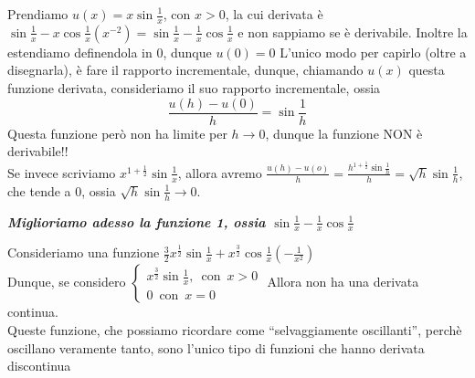 \documentclass{article}
\theoremstyle{definition}
\newcommand{\virgolette}[1]{``#1''}
\begin{document}
Prendiamo $u(x)=x\sin{\frac{1}{x}}$, con $x>0$, la cui derivata è $\sin{\frac{1}{x}}-x\cos{\frac{1}{x}}(x^{-2})=\sin{\frac{1}{x}}-\frac{1}{x}\cos{\frac{1}{x}}$ e non sappiamo se è derivabile. Inoltre la estendiamo definendola in 0, dunque $u(0)=0$ L'unico modo per capirlo (oltre a disegnarla), è fare il rapporto incrementale, dunque, chiamando $u(x)$ questa funzione derivata, consideriamo il suo rapporto incrementale, ossia
\begin{equation*}
    \frac{u(h)-u(0)}{h}=\sin{\frac{1}{h}}
\end{equation*}
Questa funzione però non ha limite per $h \to 0$, dunque la funzione NON è derivabile!!
\\
Se invece scriviamo $x^{1+\frac{1}{2}}\sin{\frac{1}{x}}$, allora avremo $\frac{u(h)-u(o)}{h}=\frac{h^{1+\frac{1}{2}}\sin{\frac{1}{h}}}{h}=\sqrt{h}\sin{\frac{1}{h}}$, che tende a 0, ossia $\sqrt{h}\sin{\frac{1}{h}} \to 0$.
\begin{center}
    \textbf{\textit{Miglioriamo adesso la funzione 1, ossia $\sin{\frac{1}{x}}-\frac{1}{x}\cos{\frac{1}{x}}$}}
\end{center}
Consideriamo una funzione $\frac{3}{2}x^{\frac{1}{2}}\sin{\frac{1}{x}}+x^{\frac{3}{2}}\cos{\frac{1}{x}}(-\frac{1}{x^2})$
\\
Dunque, se considero
$\begin{cases}
    x^{\frac{3}{2}}\sin{\frac{1}{x}}, \,\,\, \mbox{con} \,\,\, x>0 \\
    0 \,\,\, \mbox{con} \,\,\, x=0
\end{cases}$
Allora non ha una derivata continua.
\\
Queste funzione, che possiamo ricordare come \virgolette{selvaggiamente oscillanti}, perchè oscillano veramente tanto, sono l'unico tipo di funzioni che hanno derivata discontinua
\end{document}
